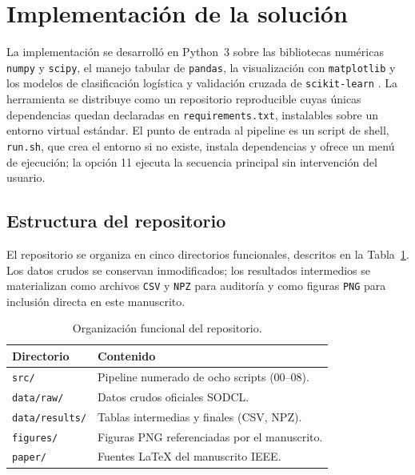 \documentclass[journal]{IEEEtran}
\begin{document}
\section{Implementación de la solución}\label{sec:implementacion}

La implementación se desarrolló en Python~3 sobre las bibliotecas numéricas \texttt{numpy} y \texttt{scipy}, el manejo tabular de \texttt{pandas}, la visualización con \texttt{matplotlib} y los modelos de clasificación logística y validación cruzada de \texttt{scikit-learn} \cite{harris2020,virtanen2020,pedregosa2011}. La herramienta se distribuye como un repositorio reproducible cuyas únicas dependencias quedan declaradas en \texttt{requirements.txt}, instalables sobre un entorno virtual estándar. El punto de entrada al pipeline es un script de shell, \texttt{run.sh}, que crea el entorno si no existe, instala dependencias y ofrece un menú de ejecución; la opción 11 ejecuta la secuencia principal sin intervención del usuario.

\subsection{Estructura del repositorio}

El repositorio se organiza en cinco directorios funcionales, descritos en la Tabla~\ref{tab:repo}. Los datos crudos se conservan inmodificados; los resultados intermedios se materializan como archivos \texttt{CSV} y \texttt{NPZ} para auditoría y como figuras \texttt{PNG} para inclusión directa en este manuscrito.

\begin{table}[t]
\centering
\small
\caption{Organización funcional del repositorio.}
\label{tab:repo}
\begin{tabular}{@{}lp{}@{}}
\toprule
\textbf{Directorio} & \textbf{Contenido} \\
\midrule
\texttt{src/} & Pipeline numerado de ocho scripts (00--08). \\
\texttt{data/raw/} & Datos crudos oficiales SODCL. \\
\texttt{data/results/} & Tablas intermedias y finales (CSV, NPZ). \\
\texttt{figures/} & Figuras PNG referenciadas por el manuscrito. \\
\texttt{paper/} & Fuentes \LaTeX{} del manuscrito IEEE. \\
\bottomrule
\end{tabular}
\end{table}
\end{document}
